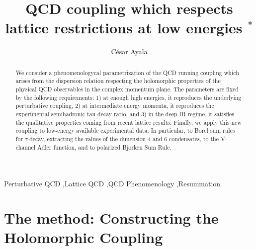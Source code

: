 \documentclass[3p,times,twocolumn]{elsarticle}
\begin{document}
\begin{frontmatter}

\title{QCD coupling which respects lattice restrictions at low energies
 $^*$}
 \author[label1]{C\'esar Ayala}
\address[label1]{Department of Physics, Universidad T{\'e}cnica Federico Santa Mar{\'\i}a, Casilla 110-V, Valpara{\'\i}so, Chile\\ }

\pagestyle{myheadings}
\markright{ }
\begin{abstract}
We consider a phenomenologycal parametrization of the QCD running coupling which 
arises from the dispersion relation respecting the holomorphic properties of the physical 
QCD observables in the complex momentum plane. The parameters are fixed by the following requirements: 1) at enough high energies, it reproduces the underlying perturbative coupling, 2) at intermediate energy momenta, it reproduces the experimental semihadronic tau decay ratio, 
and 3) in the deep IR regime, it satisfies the qualitative properties coming from recent lattice results. 
Finally, we apply this new coupling to low-energy available experimental data. In particular, to Borel sum rules for $\tau$-decay, extracting the values of the dimension 4 and 6 condensates, to the V-channel Adler function, and to polarized Bjorken Sum Rule.
 
\end{abstract}
\begin{keyword}  
Perturbative QCD \sep Lattice QCD \sep QCD Phenomenology \sep Resummation

\end{keyword}

\end{frontmatter}
\section{The method: Constructing the Holomorphic Coupling}
\end{document}
